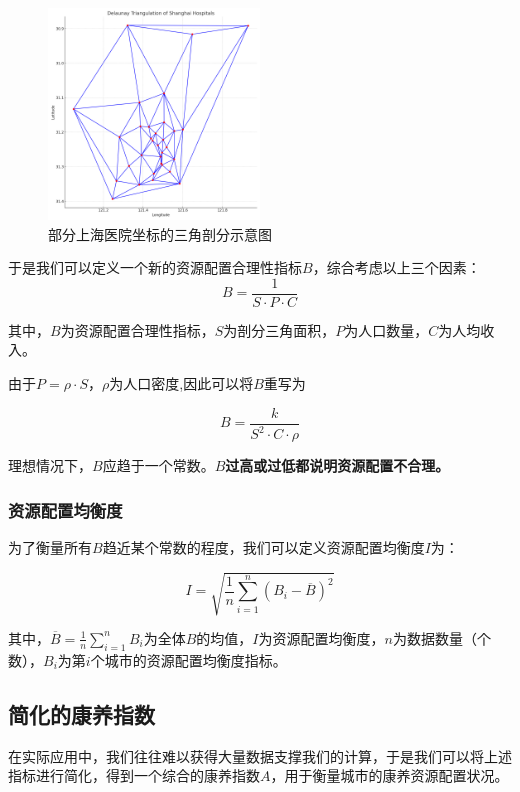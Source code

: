 \documentclass[12pt,a4paper]{article}
\begin{document}
\begin{multicols}{2}
\begin{figure}[H] %
\centering %
\includegraphics[width=0.5\textwidth]{images/delaunay_triangulation_shanghai.png} %
\caption{部分上海医院坐标的三角剖分示意图} %
\label{Fig.main2} %
\end{figure}

于是我们可以定义一个新的资源配置合理性指标$B$，综合考虑以上三个因素：
\[
B = \frac{1}{S\cdot P \cdot C}
\]

其中，$B$为资源配置合理性指标，$S$为剖分三角面积，$P$为人口数量，$C$为人均收入。

由于$P=\rho \cdot S$，$\rho$为人口密度,因此可以将$B$重写为

\[
B = \frac{k}{S^2 \cdot C \cdot \rho}
\]

理想情况下，$B$应趋于一个常数。\textbf{$B$过高或过低都说明资源配置不合理。}

\subsubsection{资源配置均衡度}

为了衡量所有$B$趋近某个常数的程度，我们可以定义资源配置均衡度$I$为：

\[
I = \sqrt{\frac{1}{n} \sum_{i=1}^{n}(B_i - \overline{B})^2}
\]

其中，$\overline{B} = \frac{1}{n} \sum_{i=1}^{n}B_i$为全体$B$的均值，$I$为资源配置均衡度，$n$为数据数量（个数），$B_i$为第$i$个城市的资源配置均衡度指标。

\subsection{简化的康养指数}

在实际应用中，我们往往难以获得大量数据支撑我们的计算，于是我们可以将上述指标进行简化，得到一个综合的康养指数$A$，用于衡量城市的康养资源配置状况。


\end{multicols}
\end{document}
